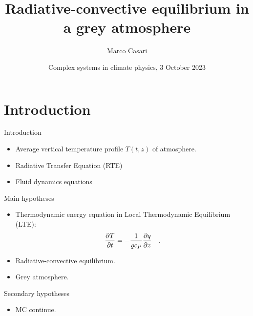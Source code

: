 \documentclass[aspectratio=43]{beamer}
\title{Radiative-convective equilibrium in a grey atmosphere}
\author{Marco Casari}
\date[03/10/2023]{Complex systems in climate physics, 3 October 2023}
\institute[UniTo]{University of Turin}
\begin{document}
\begin{frame}
  \titlepage
\end{frame}

\section{Introduction}
\begin{frame}{Introduction}
  \begin{itemize}
    \item<1-> Average vertical temperature profile $T(t, z)$ of atmosphere.
    \item<2-> Radiative Transfer Equation (RTE)
    \item<3-> Fluid dynamics equations
  \end{itemize}
\end{frame}

\begin{frame}{Main hypotheses}
  \begin{itemize}
    \item<1-> Thermodynamic energy equation in Local Thermodynamic Equilibrium (LTE):
    \begin{equation}
      \label{eq:temperature_derivation}
      \pdv{T}{t} = -\frac{1}{\varrho c_P} \pdv{q}{z}
      \quad .
    \end{equation}
    \item<2-> Radiative-convective equilibrium.
    \item<3-> Grey atmosphere.
  \end{itemize}
\end{frame}

\begin{frame}{Secondary hypotheses}
  \begin{itemize}
    \item MC continue.
  \end{itemize}
\end{frame}
\end{document}
